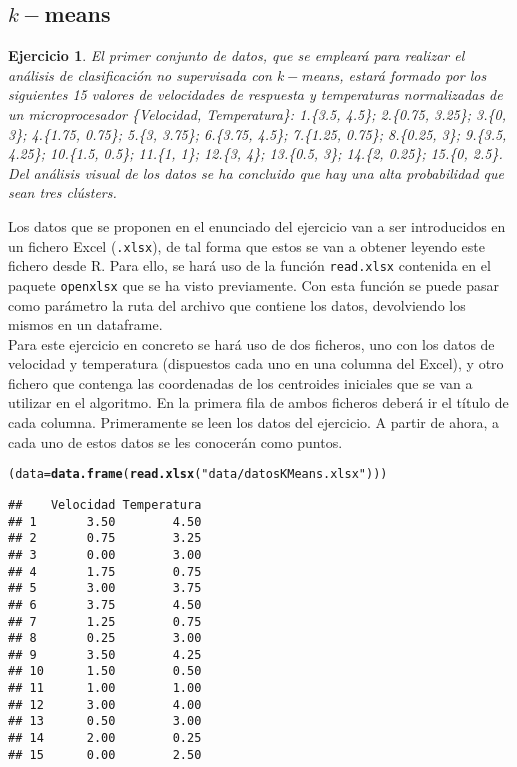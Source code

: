 \documentclass[12pt]{report}\usepackage[]{graphicx}\usepackage[dvipsnames]{xcolor}
\makeatletter
\newcommand{\hlstr}[1]{\textcolor[rgb]{0.192,0.494,0.8}{#1}}%
\newcommand{\hlstd}[1]{\textcolor[rgb]{0.345,0.345,0.345}{#1}}%
\newcommand{\hlkwb}[1]{\textcolor[rgb]{0.69,0.353,0.396}{#1}}%
\newcommand{\hlkwd}[1]{\textcolor[rgb]{0.737,0.353,0.396}{\textbf{#1}}}%
\newenvironment{kframe}{%
 \def\at@end@of@kframe{}%
 \ifinner\ifhmode%
  \def\at@end@of@kframe{\end{minipage}}%
  \begin{minipage}{\columnwidth}%
 \fi\fi%
 \def\FrameCommand##1{\hskip\@totalleftmargin \hskip-\fboxsep
 \colorbox{shadecolor}{##1}\hskip-\fboxsep
     \hskip-\linewidth \hskip-\@totalleftmargin \hskip\columnwidth}%
 \MakeFramed {\advance\hsize-\width
   \@totalleftmargin\z@ \linewidth\hsize
   \@setminipage}}%
 {\par\unskip\endMakeFramed%
 \at@end@of@kframe}
\newenvironment{knitrout}{}{} %
\newtheorem{exercise}{Ejercicio}[section]
\makeatother
\begin{document}
		 	\subsection{$k-$means}
		 
				 \begin{exercise}\label{ex:kmeans}
					 	El primer conjunto de datos, que se empleará para realizar el análisis de clasificación no supervisada con $k-$means, estará formado por los siguientes 15 valores de velocidades de respuesta y temperaturas normalizadas de un microprocesador \{Velocidad, Temperatura\}: 1.\{3.5, 4.5\}; 2.\{0.75, 3.25\}; 3.\{0, 3\}; 4.\{1.75, 0.75\}; 5.\{3, 3.75\}; 6.\{3.75, 4.5\}; 7.\{1.25, 0.75\}; 8.\{0.25, 3\}; 9.\{3.5, 4.25\}; 10.\{1.5, 0.5\}; 11.\{1, 1\}; 12.\{3, 4\}; 13.\{0.5, 3\}; 14.\{2, 0.25\}; 15.\{0, 2.5\}. Del análisis visual de los datos se ha concluido que hay una alta probabilidad que sean tres clústers.
				 \end{exercise}
				 
				 Los datos que se proponen en el enunciado del ejercicio van a ser introducidos en un fichero Excel (\texttt{.xlsx}), de tal forma que estos se van a obtener leyendo este fichero desde R. Para ello, se hará uso de la función \texttt{read.xlsx} contenida en el paquete \texttt{openxlsx} que se ha visto previamente. Con esta función se puede pasar como parámetro la ruta del archivo que contiene los datos, devolviendo los mismos en un dataframe.\\
				 
				 Para este ejercicio en concreto se hará uso de dos ficheros, uno con los datos de velocidad y temperatura (dispuestos cada uno en una columna del Excel), y otro fichero que contenga las coordenadas de los centroides iniciales que se van a utilizar en el algoritmo. En la primera fila de ambos ficheros deberá ir el título de cada columna. Primeramente se leen los datos del ejercicio. A partir de ahora, a cada uno de estos datos se les conocerán como puntos.
				 
\begin{knitrout}
\color{fgcolor}\begin{kframe}
\begin{alltt}
\hlstd{(data} \hlkwb{=} \hlkwd{data.frame}\hlstd{(}\hlkwd{read.xlsx}\hlstd{(}\hlstr{"data/datosKMeans.xlsx"}\hlstd{)))}
\end{alltt}
\begin{verbatim}
##    Velocidad Temperatura
## 1       3.50        4.50
## 2       0.75        3.25
## 3       0.00        3.00
## 4       1.75        0.75
## 5       3.00        3.75
## 6       3.75        4.50
## 7       1.25        0.75
## 8       0.25        3.00
## 9       3.50        4.25
## 10      1.50        0.50
## 11      1.00        1.00
## 12      3.00        4.00
## 13      0.50        3.00
## 14      2.00        0.25
## 15      0.00        2.50
\end{verbatim}
\end{kframe}
\end{knitrout}
				 
\end{document}
